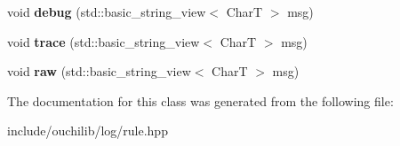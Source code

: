 \begin{DoxyCompactItemize}
\mbox{\label{classouchi_1_1log_1_1ruled__logger_afb8fe8c5a596f6024dedca39afc0c973}} 
void {\bfseries debug} (std\+::basic\+\_\+string\+\_\+view$<$ CharT $>$ msg)
\item 
\mbox{\label{classouchi_1_1log_1_1ruled__logger_a356745a6955390b5b81c4fe5a3a98b68}} 
void {\bfseries trace} (std\+::basic\+\_\+string\+\_\+view$<$ CharT $>$ msg)
\item 
\mbox{\label{classouchi_1_1log_1_1ruled__logger_a2b2b375ee377cfd3d8b72bbfe944fef9}} 
void {\bfseries raw} (std\+::basic\+\_\+string\+\_\+view$<$ CharT $>$ msg)
\end{DoxyCompactItemize}


The documentation for this class was generated from the following file\+:\begin{DoxyCompactItemize}
\item 
include/ouchilib/log/rule.\+hpp\end{DoxyCompactItemize}
